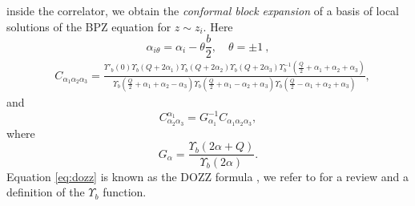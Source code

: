 \documentclass[11pt]{article}
\numberwithin{equation}{section}
\begin{document}
inside the correlator, we obtain the \emph{conformal block expansion} of a basis of local solutions of the BPZ equation for $z\sim z_i$. Here
\begin{equation}
    \alpha_{i\theta}=\alpha_i- \theta\frac{b}{2}, \quad \theta=\pm 1~,
\end{equation}
\begin{align}\label{eq:dozz}
 &C_{\alpha_1\alpha_2\alpha_3}
=\frac{\Upsilon'_b(0)\Upsilon_b(Q+2\alpha_1)\Upsilon_b(Q+2\alpha_2)\Upsilon_b(Q+2\alpha_3) \Upsilon_b^{-1}(\frac Q 2+\alpha_1+\alpha_2+\alpha_3)}{\Upsilon_b(\frac Q 2+\alpha_1+\alpha_2-\alpha_3)\Upsilon_b(\frac Q 2+\alpha_1-\alpha_2+\alpha_3)\Upsilon_b(\frac Q 2-\alpha_1+\alpha_2+\alpha_3)},
\end{align}
and 
\begin{equation}
     C^{\alpha_1}_{\alpha_2\alpha_3}=G_{\alpha_1}^{-1}C_{\alpha_1\alpha_2\alpha_3},
\end{equation}
where
\begin{equation}
G_\alpha=\frac{\Upsilon_b(2\alpha+Q)}{\Upsilon_b(2\alpha)}.
\end{equation}
Equation \eqref{eq:dozz}  is known as the DOZZ formula \cite{Dorn:1994xn,ZAMOLODCHIKOV1996577}, we refer to \cite{Teschner:2001rv} for a review and a definition of the $\Upsilon_b$ function.   
\end{document}

